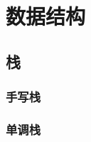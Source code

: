 \chapter{数据结构}\label{ch:data-structure}

\section{栈}\label{sec:stack}

\subsection{手写栈}\label{subsec:handwriting-stack}


\subsection{单调栈}\label{subsec:monotonic-stack}

